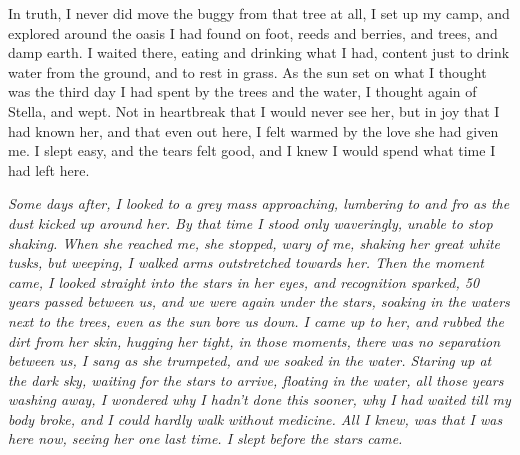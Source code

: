 In truth, I never did move the buggy from that tree at all, I set up my camp, and explored around the oasis I had found on foot, reeds and berries, and trees, and damp earth. I waited there, eating and drinking what I had, content just to drink water from the ground, and to rest in grass. As the sun set on what I thought was the third day I had spent by the trees and the water, I thought again of Stella, and wept. Not in heartbreak that I would never see her, but in joy that I had known her, and that even out here, I felt warmed by the love she had given me. I slept easy, and the tears felt good, and I knew I would spend what time I had left here.


\emph{Some days after, I looked to a grey mass approaching, lumbering to and fro as the dust kicked up around her. By that time I stood only waveringly, unable to stop shaking. When she reached me, she stopped, wary of me, shaking her great white tusks, but weeping, I walked arms outstretched towards her. Then the moment came, I looked straight into the stars in her eyes, and recognition sparked, 50 years passed between us, and we were again under the stars, soaking in the waters next to the trees, even as the sun bore us down. I came up to her, and rubbed the dirt from her skin, hugging her tight, in those moments, there was no separation between us, I sang as she trumpeted, and we soaked in the water. Staring up at the dark sky, waiting for the stars to arrive, floating in the water, all those years washing away, I wondered why I hadn't done this sooner, why I had waited till my body broke, and I could hardly walk without medicine. All I knew, was that I was here now, seeing her one last time. I slept before the stars came.}